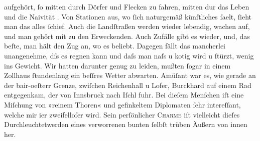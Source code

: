                aufgehört,{ }ſo mitten durch Dörfer und Flecken zu fahren, mitten dur das Leben und die Naivität \damage{\textcolor{gray}{eines Ortes}}. Von Stationen aus, wo{ }ſich naturgemäß künſtliches{ }ſa{\geminationm}elt,{ }ſieht man das alles{ }ſchief. Auch die Landſtraßen
               werden wieder lebendig, wachen auf, und man gehört mit zu den Erweckenden. Auch
               Zufälle gibt es wieder, und, das beſte, man hält den Zug an, wo es beliebt. {\pb}Dagegen fällt das mancherlei unangenehme, dſs es regnen
               kann und daſs man naſs u kotig wird u{ }ſtürzt, wenig ins Gewicht. Wir hatten darunter
               genug zu leiden, mußten{ }ſogar in einem Zollhaus{ }ſtundenlang ein beſſres Wetter
               abwarten. Amüſant war es, wie gerade an der bair-oeſterr Grenze, zwiſchen Reichenhall u Lofer, Burckhard auf einem Rad
               entgegenkam, der von Innsbruck nach Iſchl fuhr. Bei dieſem Menſchen iſt eine Miſchung
               von »reinem Thoren« und gefinkeltem Diplomaten{ }ſehr intereſſant, welche mir i{\geminationm}er zweifelloſer {\pb}wird. Sein
               perſönlicher \textsc{Charme} iſt vielleicht dieſes
               Durchleuchtetwerden eines verworrenen bunten{ }ſelbſt trüben Äußern von innen her.\pend
           
